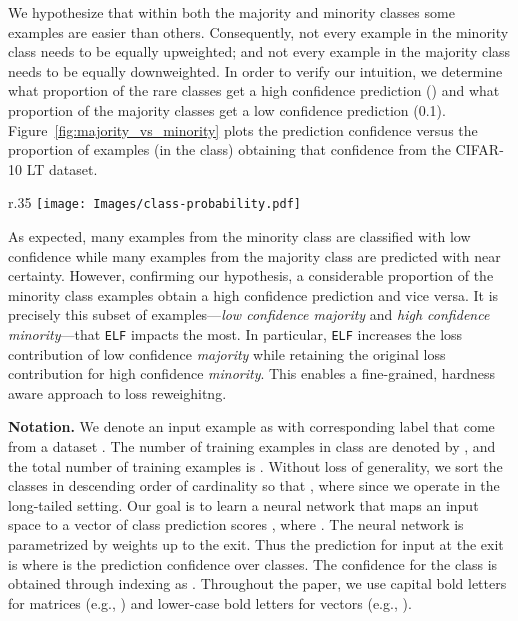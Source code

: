 \documentclass{article}
\newcommand{\method}{\texttt{ELF}\xspace}
\begin{document}
We hypothesize that within both the majority and minority classes some examples are easier than others. 
Consequently, not every example in the minority class needs to be equally upweighted; and not every example in the majority class needs to be equally downweighted.
In order to verify our intuition, we determine what proportion of the rare classes get a high confidence prediction () and what proportion of the majority classes get a low confidence prediction (0.1).
Figure~\ref{fig:majority_vs_minority} plots the prediction confidence versus the proportion of examples (in the class) obtaining that confidence from the CIFAR-10 LT dataset.

\begin{wrapfigure}{r}{.35\textwidth}
\vspace{-5mm}
\centering
\texttt{[image: Images/class-probability.pdf]}
\vspace{-5mm}
\caption{Proportion of examples in class vs. prediction confidence.}
\label{fig:majority_vs_minority}
\vspace{-5mm}
\end{wrapfigure}
As expected, many examples from the minority class are classified with low confidence while many examples from the majority class are predicted with near certainty. 
However, confirming our hypothesis, a considerable proportion of the minority class examples obtain a high confidence prediction and vice versa. 
It is precisely this subset of examples---\textit{low confidence majority} and \textit{high confidence minority}---that \method{} impacts the most.
In particular, \method{} increases the loss contribution of low confidence \textit{majority} while retaining the original loss contribution for high confidence \textit{minority}.
This enables a fine-grained, hardness aware approach to loss reweighitng.


\textbf{Notation.}\label{subsec:notation}
We denote an input example as  with corresponding label  that come from a dataset .
The number of training examples in class  are denoted by , and the total number of training examples is .
Without loss of generality, we sort the classes in descending order of cardinality so that , where  since we operate in the long-tailed setting.  
Our goal is to learn a neural network
 that maps an input space  to a vector of class prediction scores , where .
The neural network is parametrized by weights  up to the  exit.
Thus the prediction for input  at the  exit is  where  is the prediction confidence over  classes. The confidence for the  class is obtained through indexing as .
Throughout the paper, we use capital bold letters for matrices (e.g., ) 
and lower-case bold letters for vectors (e.g., ). 
\end{document}
